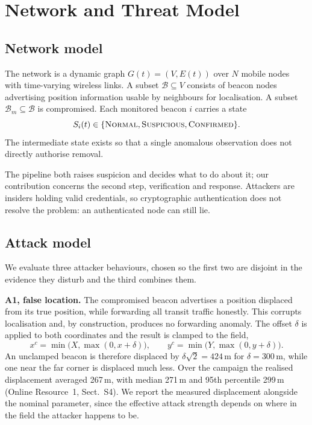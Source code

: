 \section{Network and Threat Model}
\label{sec:model}

\subsection{Network model}

The network is a dynamic graph $G(t) = (V, E(t))$ over $N$ mobile nodes with
time-varying wireless links. A subset $\mathcal{B} \subseteq V$ consists of beacon
nodes advertising position information usable by neighbours for
localisation. A subset $\mathcal{B}_m \subseteq \mathcal{B}$ is compromised.
Each monitored beacon $i$ carries a state
\begin{equation}
\label{eq:state}
S_i(t) \in \{\textsc{Normal}, \textsc{Suspicious}, \textsc{Confirmed}\}.
\end{equation}
The intermediate state exists so that a single anomalous observation does
not directly authorise removal.

The pipeline both raises suspicion and decides what to do about it; our
contribution concerns the second step, verification and response. Attackers are insiders
holding valid credentials, so cryptographic authentication does not resolve
the problem: an authenticated node can still lie.

\subsection{Attack model}

We evaluate three attacker behaviours, chosen so the first two are disjoint
in the evidence they disturb and the third combines them.

\textbf{A1, false location.} The compromised beacon advertises a position
displaced from its true position, while forwarding all transit traffic
honestly. This corrupts localisation and, by construction, produces no
forwarding anomaly. The offset $\delta$ is applied to both coordinates and
the result is clamped to the field,
\begin{equation}
\label{eq:clamp}
x^{c} = \min\bigl(X, \max(0, x + \delta)\bigr), \qquad
y^{c} = \min\bigl(Y, \max(0, y + \delta)\bigr).
\end{equation}
An unclamped beacon is therefore displaced by $\delta\sqrt{2} = 424$\,m for
$\delta = 300$\,m, while one near the far corner is displaced much less.
Over the campaign the realised displacement averaged 267\,m, with median
271\,m and 95th percentile 299\,m (Online Resource~1, Sect.~S4). We report the
measured displacement alongside the nominal parameter, since the effective
attack strength depends on where in the field the attacker happens to be.


